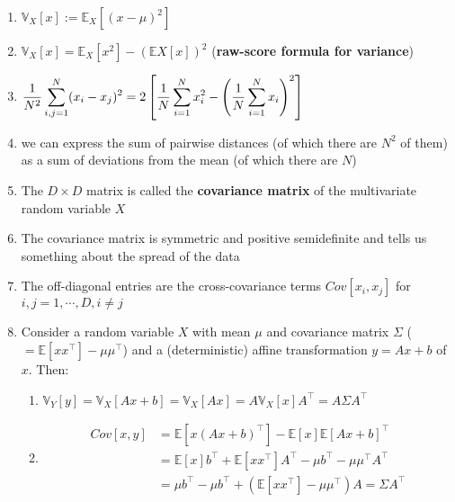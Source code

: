 \begin{enumerate}
    \item $\mathbb{V}_X[x] := \mathbb{E}_X[(x - \mu)^2]$

    \item $\mathbb{V}_X[x] = \mathbb{E}_X[x^2] - (\mathbb{E}X[x])^2$ \hfill (\textbf{raw-score formula for variance})

    \item $
        \dfrac{1}{N^2}
        \displaystyle\sum_{i,j=1}^{N} (x_i - x_j)^2
        = 2 \left[ 
            \dfrac{1}{N}\displaystyle\sum_{i=1}^{N} x_i^2
            -
            \left( 
                \dfrac{1}{N}\displaystyle\sum_{i=1}^{N} x_i 
            \right)^2
        \right]
    $

    \item we can express the sum of pairwise distances (of which there are $N^2$ of them) as a sum of deviations from the mean (of which there are $N$)

    \item The $D\times D$ matrix is called the \textbf{covariance matrix} of the multivariate random variable $X$

    \item The covariance matrix is symmetric and positive semidefinite and tells us something about the spread of the data

    \item The off-diagonal entries are the cross-covariance terms $Cov[x_i, x_j]$ for $i, j = 1, \cdots , D, i \neq j$

    \item Consider a random variable $X$ with mean $\mu$  and covariance matrix $\Sigma$ ($= \mathbb{E}[xx^\top] - \mu \mu ^\top$) and a (deterministic) affine transformation $y = Ax + b$ of $x$. Then:
    \begin{enumerate}
        \item $
            \mathbb{V}_Y[y] 
            = \mathbb{V}_X[Ax + b] 
            = \mathbb{V}_X[Ax] 
            = A\mathbb{V}_X[x]A^\top = A\Sigma A^\top
        $

        \item 
        \begin{align*}
            Cov[x, y] 
            &= \mathbb{E}[x(Ax + b)^\top ] - \mathbb{E}[x]\mathbb{E}[Ax + b]^\top \\
            &= \mathbb{E}[x]b^\top  + \mathbb{E}[xx^\top ]A^\top  - \mu b^\top  - \mu \mu ^\top A^\top \\
            &= \mu b^\top  - \mu b^\top  + (\mathbb{E}[xx^\top ] - \mu \mu ^\top )A =  \Sigma A^\top
        \end{align*}


\end{enumerate}
\end{enumerate}
